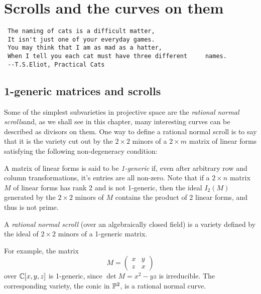 

\chapter{Scrolls and the curves on them}
\label{ScrollsChapter}


\begin{verbatim}
 The naming of cats is a difficult matter,
 It isn't just one of your everyday games.
 You may think that I am as mad as a hatter,
 When I tell you each cat must have three different 	names.
 --T.S.Eliot, Practical Cats
\end{verbatim}
\section{1-generic matrices and scrolls}
Some of the simplest subvarieties in projective space are the \emph{rational normal scrolls}and, as we shall see in this chapter, many interesting  curves can be described as divisors on them. One way to define a rational normal scroll is to say that it is the variety cut out by the $2\times 2$ minors of a $2\times m$ matrix of linear forms satisfying the following non-degeneracy condition: 
\begin{definition}
 A matrix of linear forms is said to be \emph{1-generic} if, even after arbitrary row and column transformations, it's entries are all non-zero. Note that if a $2\times n$ matrix
 $M$ of linear forms has rank 2 and is not 1-generic, then the ideal $I_2(M)$ generated by the $2\times 2$ minors of $M$ contains the product of 2 linear forms, and thus is not prime.
\end{definition}

\begin{definition}
A \emph{rational normal scroll} (over an algebraically closed field) is a variety defined by the ideal of $2\times 2$ minors
of a 1-generic matrix. 
\end{definition}
For example, the matrix 
$$
M = \begin{pmatrix}
 x &y\\
 z&x
\end{pmatrix}
$$
over $\CC[x,y,z]$ is  1-generic, since
$\det M = x^2-yz$ is irreducible. The corresponding variety, the conic in $\PP^2$,
is a rational normal curve.


